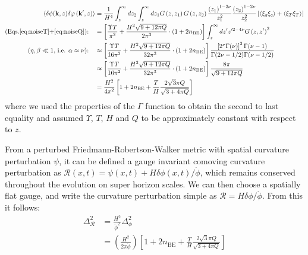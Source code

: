 \begin{align}
\left\langle\delta \phi(\mathbf{k}, z) \delta \varphi\left(\mathbf{k}^{\prime}, z\right)\right\rangle  &=\frac{1}{H^4} \int_z^{\infty} d z_2 \int_z^{\infty} d z_1 G\left(z, z_1\right) G\left(z, z_2\right) \frac{\left(z_1\right)^{1-2 \nu}}{z_1^2} \frac{\left(z_2\right)^{1-2 \nu}}{z_2^2}\left[\left\langle\xi_q \xi_q\right\rangle +\left\langle\xi_T\xi_T\right\rangle \right] \nonumber \\
\text{(Eqs.\ref{eq:noiseT}+\ref{eq:noiseQ}):} \quad &=\left[\frac{\Upsilon T}{\pi^2}+\frac{H^2\sqrt{9+12\pi Q}}{ 2\pi^3}\cdot(1+2n_{\mathrm{BE}}) \right]\int_z^{\infty} d z^{\prime} z^{\prime 2-4 \nu} G\left(z, z^{\prime}\right)^2 \nonumber \\
 \text{($\eta, \beta \ll 1$, i.e. $\alpha\approx\nu$):} \quad &\approx \left[\frac{\Upsilon T}{16\pi^2}+\frac{H^2\sqrt{9+12\pi Q}}{ 32\pi^3}\cdot(1+2n_{\mathrm{BE}}) \right] \frac{\left[2^\nu \Gamma(\nu)\right]^2 \Gamma(\nu-1)}{\Gamma(2 \nu-1 / 2) \Gamma(\nu-1 / 2)} \nonumber \\
 &\approx \left[\frac{\Upsilon T}{16\pi^2}+\frac{H^2\sqrt{9+12\pi Q}}{ 32\pi^3}\cdot(1+2n_{\mathrm{BE}}) \right]\frac{8\pi}{\sqrt{9+12\pi Q}}\nonumber \\
 &=\frac{H^2}{4\pi^2}\left[1+2n_{\mathrm{BE}}+\frac{T}{H}\frac{2\sqrt{3}\pi Q}{\sqrt{3+4\pi Q}} \right]
\end{align}
where we used the properties of the $\Gamma$ function to obtain the second to last equality and assumed $\Upsilon$, $T$, $H$ and $Q$ to be approximately constant with respect to $z$.

From a perturbed Friedmann-Robertson-Walker metric with spatial curvature perturbation $\psi$, it can be defined a gauge invariant comoving curvature perturbation as $\mathcal{R}(x, t) = \psi(x, t) + H\delta\phi(x, t)/\dot{\phi}$, which remains conserved throughout the evolution on super horizon scales. We can then choose a spatially flat gauge,
and write the curvature perturbation simple as $\mathcal{R}= H\delta\phi/\dot{\phi}$. From this it follows:
\begin{align}
    \Delta_{\mathcal{R}}^2&=\frac{H^2}{\dot{\phi}^2}\Delta_{\phi}^2 \nonumber \\
    &=\left(\frac{H^2}{2\pi \dot{\phi}}\right)\left[1+2n_{\mathrm{BE}}+\frac{T}{H}\frac{2\sqrt{3}\pi Q}{\sqrt{3+4\pi Q}} \right]
\end{align}
